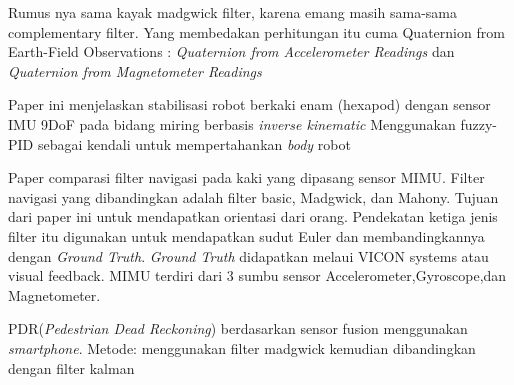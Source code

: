 \documentclass{article}
\begin{document}
Rumus nya sama kayak madgwick filter, karena emang masih sama-sama complementary filter. Yang membedakan perhitungan itu cuma Quaternion from Earth-Field Observations :\emph{ Quaternion from Accelerometer Readings} dan \emph{ Quaternion from Magnetometer Readings}

\cite{Asrofi2015} Paper ini menjelaskan stabilisasi robot berkaki enam (hexapod) dengan sensor IMU 9DoF pada bidang miring berbasis \emph{inverse kinematic}
Menggunakan fuzzy-PID sebagai kendali untuk mempertahankan \emph{body} robot

\cite{Ludwig2018} Paper comparasi filter navigasi pada  kaki yang dipasang sensor MIMU. Filter navigasi yang dibandingkan adalah filter basic, Madgwick, dan Mahony. Tujuan dari paper ini untuk mendapatkan orientasi dari orang. Pendekatan ketiga jenis filter itu digunakan untuk mendapatkan sudut Euler dan membandingkannya dengan \emph{Ground Truth}. \emph{Ground Truth} didapatkan melaui VICON systems atau visual feedback.
MIMU terdiri dari 3 sumbu sensor Accelerometer,Gyroscope,dan Magnetometer.

\cite{Hasan2020} PDR(\emph{Pedestrian Dead Reckoning}) berdasarkan sensor fusion menggunakan \emph{smartphone}. 
Metode: menggunakan filter madgwick kemudian dibandingkan dengan filter kalman 



\end{document}
